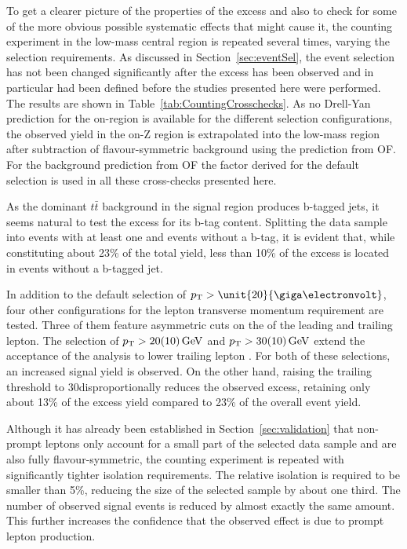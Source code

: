 To get a clearer picture of the properties of the excess and also to check for some of the more obvious possible systematic effects that might cause it, the counting experiment in the low-mass central region is repeated several times, varying the selection requirements. As discussed in Section~\ref{sec:eventSel}, the event selection has not been changed significantly after the excess has been observed and in particular had been defined before the studies presented here were performed. The results are shown in Table~\ref{tab:CountingCrosschecks}. As no Drell-Yan prediction for the on-\Z region is available for the different selection configurations, the observed yield in the on-Z region is extrapolated into the low-mass region after subtraction of flavour-symmetric background using the prediction from OF. For the background prediction from OF the \Rsfof factor derived for the default selection is used in all these cross-checks presented here.

As the dominant $t\bar{t}$ background in the signal region produces b-tagged jets, it seems natural to test the excess for its b-tag content. Splitting the data sample into events with at least one and events without a b-tag, it is evident that, while constituting about 23\% of the total yield, less than 10\% of the excess is located in events without a b-tagged jet. 

In addition to the default selection of $\pt > \unit{20}{\giga\electronvolt}$, four other configurations for the lepton transverse momentum requirement are tested. Three of them feature asymmetric cuts on the \pt of the leading and trailing lepton. The selection of $p_{\mathrm{T}} > 20(10)\,\mathrm{Ge\hspace{-.08em}V}$ and $ p_{\mathrm{T}} > 30(10)\,\mathrm{Ge\hspace{-.08em}V}$ extend the acceptance of the analysis to lower trailing lepton \pt. For both of these selections, an increased signal yield is observed. On the other hand, raising the trailing \pt threshold to 30\GeV disproportionally reduces the observed excess, retaining only about 13\% of the excess yield compared to 23\% of the overall event yield. 

Although it has already been established in Section~\ref{sec:validation} that non-prompt leptons only account for a small part of the selected data sample and are also fully flavour-symmetric, the counting experiment is repeated with significantly tighter isolation requirements. The relative isolation is required to be smaller than 5\%, reducing the size of the selected sample by about one third. The number of observed signal events is reduced by almost exactly the same amount. This further increases the confidence that the observed effect is due to prompt lepton production.

